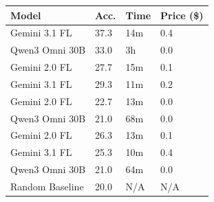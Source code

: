 \begin{tabular}{llll}
\toprule
Model & Acc. & Time & Price (\$) \\
\midrule
Gemini 3.1 FL & 37.3 & 14m & 0.4 \\
Qwen3 Omni 30B & 33.0 & 3h & 0.0 \\
Gemini 2.0 FL & 27.7 & 15m & 0.1 \\
\midrule
Gemini 3.1 FL & 29.3 & 11m & 0.2 \\
Gemini 2.0 FL & 22.7 & 13m & 0.0 \\
Qwen3 Omni 30B & 21.0 & 68m & 0.0 \\
\midrule
Gemini 2.0 FL & 26.3 & 13m & 0.1 \\
Gemini 3.1 FL & 25.3 & 10m & 0.4 \\
Qwen3 Omni 30B & 21.0 & 64m & 0.0 \\
\midrule
Random Baseline & 20.0 & N/A & N/A \\
\bottomrule
\end{tabular}
